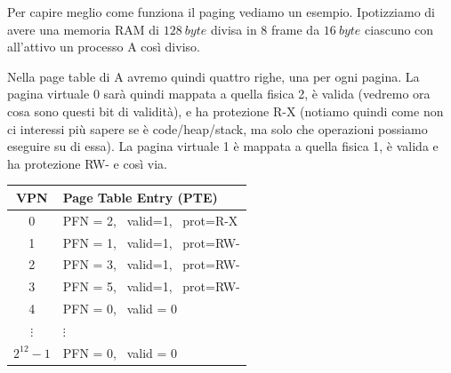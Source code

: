 \documentclass[11pt, a4paper, titlepage, oneside]{scrbook}
\begin{document}
\begin{minipage}[c]{0.48\textwidth}
    Per capire meglio come funziona il paging vediamo un esempio. Ipotizziamo di avere una memoria RAM di $\SI{128}{byte}$ divisa in 8 frame da $\SI{16}{byte}$ ciascuno con all'attivo un processo A così diviso.

\end{minipage}\hfill
\begin{minipage}[c]{0.47\textwidth}
\centering
{}
\end{minipage}


\begin{minipage}[c]{0.50\textwidth}
Nella page table di A avremo quindi quattro righe, una per ogni pagina. La pagina virtuale 0 sarà quindi mappata a quella fisica 2, è valida (vedremo ora cosa sono questi bit di validità), e ha protezione R-X (notiamo quindi come non ci interessi più sapere se è code/heap/stack, ma solo che operazioni possiamo eseguire su di essa). La pagina virtuale 1 è mappata a quella fisica 1, è valida e ha protezione RW- e così via. 
\end{minipage}%
\hfill
\begin{minipage}[c]{0.45\textwidth}
\centering
\begin{tabular}{|c|l|}
  \hline
  VPN & Page Table Entry (PTE) \\
  \hline
  0 & PFN = 2, \ valid=1, \ prot=R-X \\
  1 & PFN = 1, \ valid=1, \ prot=RW- \\
  2 & PFN = 3, \ valid=1, \ prot=RW- \\
  3 & PFN = 5, \ valid=1, \ prot=RW- \\
  4 & PFN = 0, \ valid = 0 \\
  $\vdots$ & $\vdots$ \\
  $2^{12} - 1$ & PFN = 0, \ valid = 0 \\
  \hline
\end{tabular}
\end{minipage}
\end{document}
